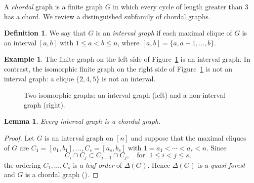 \documentclass[12pt,a4paper]{amsart}
\newtheorem{Lemma}[Theorem]{Lemma}
\theoremstyle{definition}
\newtheorem{Definition}[Theorem]{Definition}
\newtheorem{Example}[Theorem]{Example}
\begin{document}
A \emph{chordal} graph is a finite graph $G$ in which every cycle of length greater 
than $3$ has a chord. We review a distinguished subfamily of chordal graphs.
\begin{Definition}
  We say that $G$ is an \emph{interval graph} if each maximal clique of $G$ is an 
interval $[a,b]$ with $1 \leq a < b \leq n$, where
$
[a,b] = \{a, a+1, \ldots, b\}.
$  
\end{Definition}

\begin{Example}
The finite graph on the left side of Figure~\ref{fig: interval_graph} is an interval graph. In contrast, the isomorphic finite graph on the right side of Figure~\ref{fig: interval_graph} is not an interval graph: a clique $\{2,4,5\}$ is not an interval. 
\begin{figure}
    \centering
{}
    \caption{Two isomorphic graphs: an interval graph (left) and a non-interval graph (right).}
    \label{fig: interval_graph}
\end{figure}
\end{Example}







\begin{Lemma}
Every interval graph is a chordal graph.   
\end{Lemma}

\begin{proof}
Let $G$ is an interval graph on $[n]$ and suppose that the maximal cliques of $G$ are $C_1 =[a_1, b_1], \ldots, C_s=[a_s, b_s]$ with $1=a_1 < \cdots < a_s < n$.  Since 
\[
C_i \cap C_j \subset C_{j-1} \cap C_j, \quad \text{for } \; 1 \leq i < j \leq s, 
\]
the ordering $C_1, \ldots, C_s$ is a \emph{leaf order} \cite[p.~172]{HHgtm260} of $\Delta(G)$.  Hence $\Delta(G)$ is a \emph{quasi-forest} \cite[p.~172]{HHgtm260} and $G$ is a chordal graph (\cite[Theorem 9.2.12]{HHgtm260}).  
\end{proof}
\end{document}

